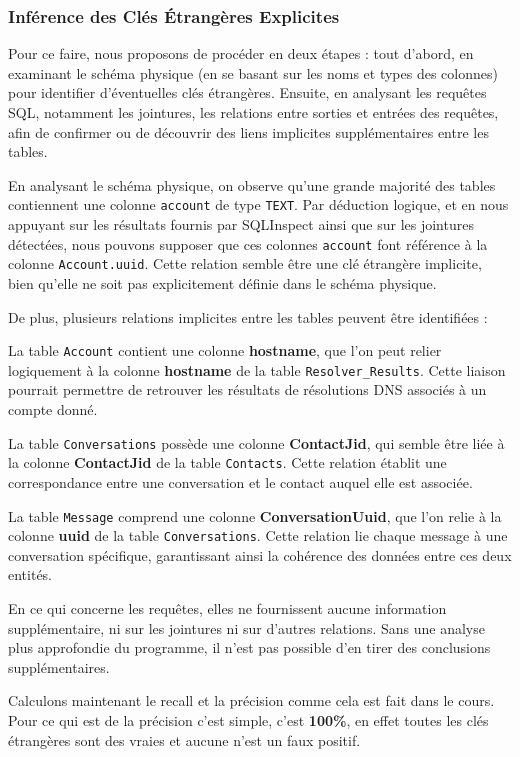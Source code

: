 \documentclass[a4paper,11pt]{article}
\begin{document}
\subsubsection*{Inférence des Clés Étrangères Explicites}
Pour ce faire, nous proposons de procéder en deux étapes : tout d'abord, en examinant le schéma physique (en se basant sur les noms et types des colonnes) pour identifier d'éventuelles clés étrangères. Ensuite, en analysant les requêtes SQL, notamment les jointures, les relations entre sorties et entrées des requêtes, afin de confirmer ou de  découvrir des liens implicites supplémentaires entre les tables.

En analysant le schéma physique, on observe qu'une grande majorité des tables contiennent une colonne \texttt{account} de type \texttt{TEXT}. Par déduction logique, et en nous appuyant sur les résultats fournis par SQLInspect ainsi que sur les jointures détectées, nous pouvons supposer que ces colonnes \texttt{account} font référence à la colonne \texttt{Account.uuid}. Cette relation semble être une clé étrangère implicite, bien qu'elle ne soit pas explicitement définie dans le schéma physique. 

De plus, plusieurs relations implicites entre les tables peuvent être identifiées :

La table \texttt{Account} contient une colonne \textbf{hostname}, que l'on peut relier logiquement à la colonne \textbf{hostname} de la table \texttt{Resolver\_Results}. Cette liaison pourrait permettre de retrouver les résultats de résolutions DNS associés à un compte donné.

La table \texttt{Conversations} possède une colonne \textbf{ContactJid}, qui semble être liée à la colonne \textbf{ContactJid} de la table \texttt{Contacts}. Cette relation établit une correspondance entre une conversation et le contact auquel elle est associée.

La table \texttt{Message} comprend une colonne \textbf{ConversationUuid}, que l'on relie à la colonne \textbf{uuid} de la table \texttt{Conversations}. Cette relation lie chaque message à une conversation spécifique, garantissant ainsi la cohérence des données entre ces deux entités.

En ce qui concerne les requêtes, elles ne fournissent aucune information supplémentaire, ni sur les jointures ni sur d'autres relations. Sans une analyse plus approfondie du programme, il n'est pas possible d'en tirer des conclusions supplémentaires.

Calculons maintenant le recall et la précision comme cela est fait dans le cours. Pour ce qui est de la précision c'est simple, c'est \textbf{100\%}, en effet toutes les clés étrangères sont des vraies et aucune n'est un faux positif. 
\end{document}
